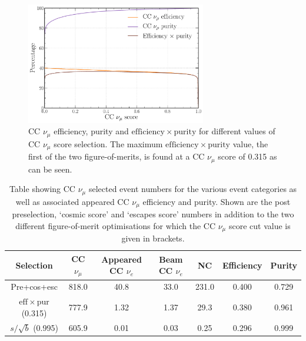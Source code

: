 \begin{figure} %
    \includegraphics[width=0.7\textwidth]{diagrams/6-cvn/chipsnet/final_numu_eff_curves.pdf}
    \caption[CC $\nu_{\mu}$ efficiency, purity and $\mathrm{efficiency}\times\mathrm{purity}$.]
    {CC $\nu_{\mu}$ efficiency, purity and $\mathrm{efficiency}\times\mathrm{purity}$ for
        different values of CC $\nu_{\mu}$ score selection. The maximum
        $\mathrm{efficiency}\times\mathrm{purity}$ value, the first of the two figure-of-merits,
        is found at a CC $\nu_{\mu}$ score of 0.315 as can be seen.}
    \label{fig:final_numu_eff_curves}
\end{figure}

\begin{table}
    \begin{tabular}{ccccccc}
        Selection                                & CC $\nu_{\mu}$ & Appeared CC $\nu_{e}$ & Beam CC $\nu_{e}$ & NC    & Efficiency & Purity \\
        \midrule
        Pre+cos+esc                              & 818.0          & 40.8                  & 33.0              & 231.0 & 0.400      & 0.729  \\
        \midrule
        $\mathrm{eff}\times\mathrm{pur}$ (0.315) & 777.9          & 1.32                  & 1.37              & 29.3  & 0.380      & 0.961  \\
        $s/\sqrt{b}$ (0.995)                     & 605.9          & 0.01                  & 0.03              & 0.25  & 0.296      & 0.999  \\
    \end{tabular}
    \caption[Table showing CC $\nu_{\mu}$ selected event numbers.]
    {Table showing CC $\nu_{\mu}$ selected event numbers for the various event categories as well
        as associated appeared CC $\nu_{\mu}$ efficiency and purity. Shown are the post
        preselection, `cosmic score' and `escapes score' numbers in addition to the two different
        figure-of-merit optimisations for which the CC $\nu_{\mu}$ score cut value is given in
        brackets.}
    \label{tab:numu_selection}
\end{table}

